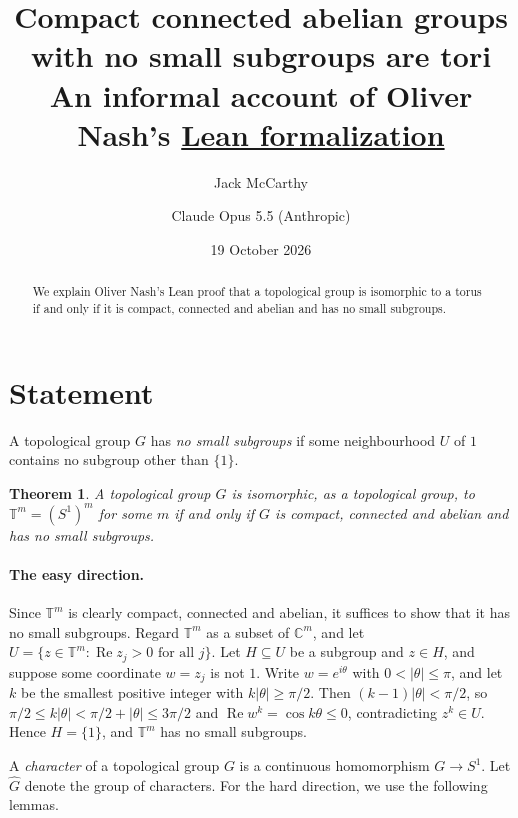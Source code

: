 \documentclass[11pt]{article}
\title{Compact connected abelian groups with no small subgroups are tori\\[0.6em]
  \large An informal account of Oliver Nash's \href{https://gist.github.com/ocfnash/19552b9031bff4888300777355b60991}{Lean formalization}}
\author{Jack McCarthy \and Claude Opus 5.5 (Anthropic)}
\date{19 October 2026}
\newtheorem{theorem}{Theorem}
\newcommand{\T}{\mathbb{T}}
\newcommand{\C}{\mathbb{C}}
\newcommand{\Ghat}{\widehat{G}}
\begin{document}
\maketitle

\begin{abstract}
\noindent We explain Oliver Nash's Lean proof that a topological group is isomorphic to a torus if and only if it is compact, connected and abelian and has no small subgroups.
\end{abstract}

\section{Statement}

A topological group $G$ has \emph{no small subgroups} if some neighbourhood $U$ of $1$ contains no subgroup other than $\{1\}$.

\begin{theorem}\label{thm:main}
A topological group $G$ is isomorphic, as a topological group, to $\T^m = (S^1)^m$ for some $m$ if and only if $G$ is compact, connected and abelian and has no small subgroups.
\end{theorem}

\paragraph{The easy direction.} Since $\T^m$ is clearly compact, connected and abelian, it suffices to show that it has no small subgroups. Regard $\T^m$ as a subset of $\C^m$, and let $U = \{z \in \T^m : \operatorname{Re} z_j > 0 \text{ for all } j\}$. Let $H \subseteq U$ be a subgroup and $z \in H$, and suppose some coordinate $w = z_j$ is not $1$. Write $w = e^{i\theta}$ with $0 < |\theta| \le \pi$, and let $k$ be the smallest positive integer with $k|\theta| \ge \pi/2$. Then $(k-1)|\theta| < \pi/2$, so $\pi/2 \le k|\theta| < \pi/2 + |\theta| \le 3\pi/2$ and $\operatorname{Re} w^k = \cos k\theta \le 0$, contradicting $z^k \in U$. Hence $H = \{1\}$, and $\T^m$ has no small subgroups.

\medskip\noindent A \emph{character} of a topological group $G$ is a continuous homomorphism $G \to S^1$. Let $\Ghat$ denote the group of characters. For the hard direction, we use the following lemmas.
\end{document}
